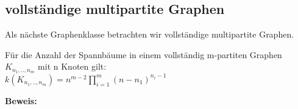 \subsection{vollständige multipartite Graphen}
 
Als nächste Graphenklasse betrachten wir vollständige multipartite Graphen.

\begin{Tms}
 Für die Anzahl der Spannbäume in einem vollständig m-partiten Graphen $K_{n_1,..,n_m}$ mit n Knoten gilt:\\
 $\mathit{k}(K_{n_1,..,n_m})=n^{m-2}\prod_{i=1}^{m}(n-n_1)^{n_i-1}$
\end{Tms}
\textbf{Beweis:}
